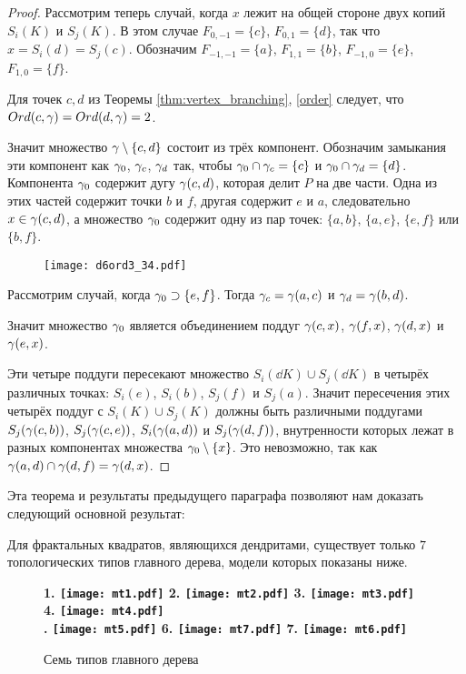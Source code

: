 \begin{proof}
Рассмотрим теперь случай, когда $x$ лежит на общей стороне двух копий $S_i(K)$ и $S_j(K)$. 
В этом случае $F_{0,-1}=\{c\}$, $F_{0,1}=\{d\}$, так что $x=S_i(d)=S_j(c)$.  
Обозначим $F_{-1,-1}=\{a\}$, $F_{1 ,1}=\{b\}$, $F_{-1,0}=\{e\}$, $F_{1,0}=\{f\}$.

Для точек $c,d$ из Теоремы \ref{thm:vertex_branching}, \ref{order} следует, что $Ord(c,\gamma)=Ord(d,\gamma)=2$. 

Значит множество $\gamma\setminus\{c,d\}$  состоит из трёх компонент. 
Обозначим замыкания эти компонент как $\gamma_0$, $\gamma_c$, $\gamma_d$ так, чтобы $\gamma_0\cap\gamma_c=\{c\}$ и $\gamma_0\cap \gamma_d=\{d\}$. 
Компонента $\gamma_0$ содержит дугу $\gamma(c,d)$, которая делит $P$ на две части. 
Одна из этих частей содержит точки $b$ и $f$, другая содержит $e$ и $a$, следовательно $x\in \gamma(c,d)$, а множество $\gamma_0$ содержит одну из пар точек: $\{a,b\}$, $\{a,e\}$, $\{e,f\}$ или $\{b,f\}$. 

\begin{figure}[H]
    \centering
    \texttt{[image: d6ord3\_34.pdf]}
\end{figure}

Рассмотрим случай, когда $\gamma_0\supset\{e,f\}$. 
Тогда $\gamma_c=\gamma(a,c)$ и $\gamma_d=\gamma(b,d)$.

Значит множество $\gamma_0$ является объединением поддуг  $\gamma(c,x)$, $\gamma(f,x)$, $\gamma(d,x)$ и $\gamma(e,x)$.

Эти четыре поддуги пересекают множество $S_i(\dd K)\cup S_j(\dd K)$ в четырёх различных точках: $S_i(e)$, $S_i(b)$, $S_j(f)$ и $S_j(a)$. 
Значит пересечения этих четырёх поддуг с $S_i( K)\cup S_j(K)$ должны быть различными поддугами $S_j(\gamma(c,b))$, $S_j(\gamma(c,e))$, $S_i(\gamma(a,d))$ и $S_j(\gamma(d,f))$, внутренности которых лежат в разных компонентах множества $\gamma_0\setminus\{x\}$. 
Это невозможно, так как $\gamma(a,d)\cap\gamma(d,f)=\gamma(d,x)$.
\end{proof}

Эта теорема и результаты предыдущего параграфа позволяют нам доказать следующий основной результат:

\begin{theorem}\label{thm:7trees}
Для фрактальных квадратов, являющихся дендритами, существует только $7$ топологических типов главного дерева, модели которых показаны ниже.
\end{theorem}

\begin{figure}[H]
    \centering \Large {\bf
    1. \texttt{[image: mt1.pdf]}
    \hfill
    2. \texttt{[image: mt2.pdf]}
    \hfill
    3. \texttt{[image: mt3.pdf]}
    \hfill
    4. \texttt{[image: mt4.pdf]}\\
    . \texttt{[image: mt5.pdf]}
    \hfill
    6. \texttt{[image: mt7.pdf]}
    \hfill
    7. \texttt{[image: mt6.pdf]}}
    \caption{Семь типов главного дерева}
    \label{fig:7trees}
\end{figure}

